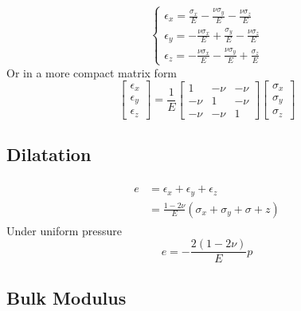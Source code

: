 \documentclass[twoside]{article}
\begin{document}
	\begin{equation}
		\begin{cases}
			\epsilon_x = \frac{\sigma_x}{E}-\frac{\nu \sigma_y}{E}-\frac{\nu \sigma_z}{E} \\
			\epsilon_y = -\frac{\nu \sigma_x}{E}+\frac{\sigma_y}{E}-\frac{\nu \sigma_z}{E} \\
			\epsilon_z = -\frac{\nu \sigma_x}{E}-\frac{\nu \sigma_y}{E}+\frac{\sigma_z}{E}
		\end{cases}
		\label{GeneralisedHookesLaw}
	\end{equation}
	Or in a more compact matrix form
	\begin{equation}
		\begin{bmatrix}
			\epsilon_x \\
			\epsilon_y \\
			\epsilon_z
		\end{bmatrix}
		= \frac{1}{E}
		\begin{bmatrix}
			1 & -\nu & -\nu \\
			-\nu & 1 & -\nu \\
			-\nu & -\nu & 1
		\end{bmatrix}
		\begin{bmatrix}
			\sigma_x \\
			\sigma_y \\
			\sigma_z
		\end{bmatrix}
		\label{eq:GeneralisedHookesLawMatrix}
	\end{equation}
	
	\subsection{Dilatation}
	
	\begin{align}
		\begin{split}
			e &= \epsilon_x+\epsilon_y+\epsilon_z \\
			  &= \frac{1-2\nu}{E} (\sigma_x+\sigma_y+\sigma+z)
			  \label{eq:Dilataion}
		\end{split}
	\end{align}
	Under uniform pressure
	\begin{equation}
		e = -\frac{2(1-2\nu)}{E} p
		\label{eq:DilatationPressure}
	\end{equation}
	
	\subsection{Bulk Modulus}
	
\end{document}
